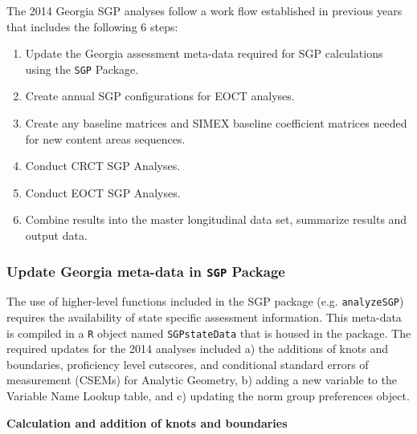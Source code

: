 \documentclass[12pt]{article}
\begin{document}
The 2014 Georgia SGP analyses follow a work flow established in previous
years that includes the following 6 steps:

\begin{enumerate}
\def\labelenumi{\arabic{enumi}.}
\itemsep1pt\parskip0pt
\item
  Update the Georgia assessment meta-data required for SGP calculations
  using the \texttt{SGP} Package.
\item
  Create annual SGP configurations for EOCT analyses.
\item
  Create any baseline matrices and SIMEX baseline coefficient matrices
  needed for new content areas sequences.
\item
  Conduct CRCT SGP Analyses.
\item
  Conduct EOCT SGP Analyses.
\item
  Combine results into the master longitudinal data set, summarize
  results and output data.
\end{enumerate}

\subsubsection{Update Georgia meta-data in \texttt{SGP}
Package}\label{update-georgia-meta-data-in-sgp-package}

The use of higher-level functions included in the SGP package (e.g.
\texttt{analyzeSGP}) requires the availability of state specific
assessment information. This meta-data is compiled in a \texttt{R}
object named \texttt{SGPstateData} that is housed in the package. The
required updates for the 2014 analyses included a) the additions of
knots and boundaries, proficiency level cutscores, and conditional
standard errors of measurement (CSEMs) for Analytic Geometry, b) adding
a new variable to the Variable Name Lookup table, and c) updating the
norm group preferences object.

\textbf{Calculation and addition of knots and boundaries}
\end{document}
